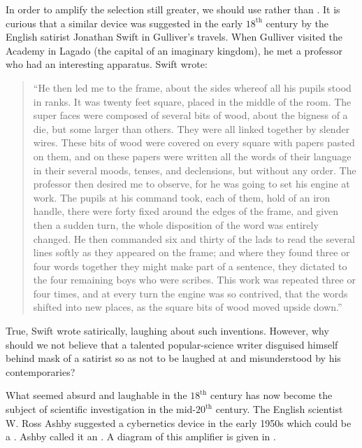 In order to amplify the selection still greater, we should use 
rather than . It is curious that a similar device was suggested in
the early $18^{\text{th}}$ century by the English satirist Jonathan Swift in
Gulliver's travels. When Gulliver visited the Academy in Lagado (the
capital of an imaginary kingdom), he met a professor who had an
interesting apparatus. Swift wrote:
\begin{quote}
``He then led me to the frame, about the sides whereof all his pupils
stood in ranks. It was twenty feet square, placed in the middle of the
room. The super faces were composed of several bits of wood, about the
bigness of a die, but some larger than others. They were all linked together
by slender wires. These bits of wood were covered on every square
with papers pasted on them, and on these papers were written all the
words of their language in their several moods, tenses, and declensions,
but without any order. The professor then desired me to observe, for he
was going to set his engine at work. The pupils at his command took,
each of them, hold of an iron handle, there were forty fixed around the
edges of the frame, and given then a sudden turn, the whole disposition
of the word was entirely changed. He then commanded six and thirty of
the lads to read the several lines softly as they appeared on the frame;
and where they found three or four words together they might make part of a sentence, they dictated to the four remaining boys who were scribes. This work was repeated three or four times, and at every turn the engine was so contrived, that the words shifted into new places, as the square bits of wood moved upside down.''
\end{quote}
True, Swift wrote satirically, laughing about such inventions.
However, why should we not believe that a talented popular-science
writer disguised himself behind mask of a satirist so as not to be
laughed at and misunderstood by his contemporaries?

What seemed absurd and laughable in the $18^{\text{th}}$ century has now
become the subject of scientific investigation in the mid-$20^{\text{th}}$ century. The English scientist W. Ross Ashby suggested a cybernetics device in
the early 1950s which could be a . Ashby called it an
. A diagram of this amplifier is given in .

